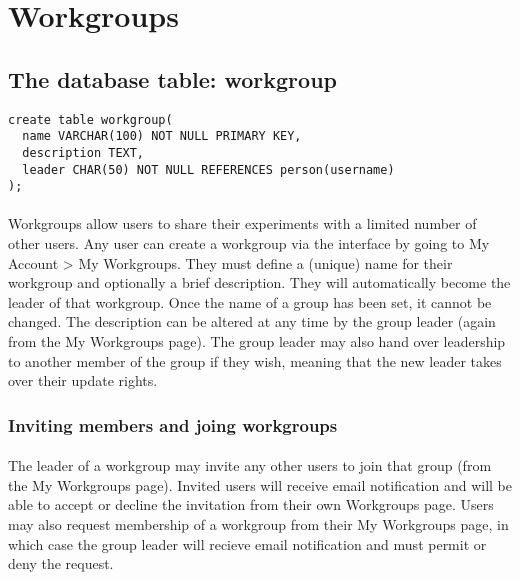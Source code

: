 \section{Workgroups}
\label{workgroups}

\subsection{The database table: workgroup}

\begin{verbatim}
create table workgroup(
  name VARCHAR(100) NOT NULL PRIMARY KEY,
  description TEXT,
  leader CHAR(50) NOT NULL REFERENCES person(username)
);
\end{verbatim}

\paragraph{}
Workgroups allow users to share their experiments with a limited number of other users. Any user can create a workgroup via the interface by going to My Account > My Workgroups. They must define a (unique) name for their workgroup and optionally a brief description. They will automatically become the leader of that workgroup. Once the name of a group has been set, it cannot be changed. The description can be altered at any time by the group leader (again from the My Workgroups page). The group leader may also hand over leadership to another member of the group if they wish, meaning that the new leader takes over their update rights.

\subsubsection{Inviting members and joing workgroups}

\paragraph{}
The leader of a workgroup may invite any other users to join that group (from the My Workgroups page). Invited users will receive email notification and will be able to accept or decline the invitation from their own Workgroups page. Users may also request membership of a workgroup from their My Workgroups page, in which case the group leader will recieve email notification and must permit or deny the request.

